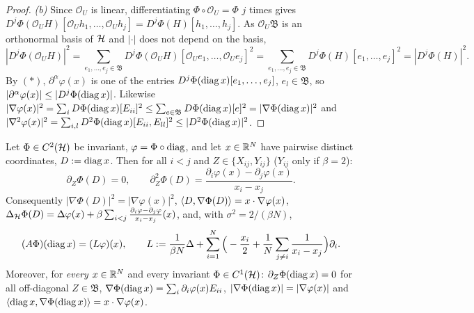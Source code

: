 \begin{proof}
\emph{(b)} Since $\mathcal O_U$ is linear, differentiating $\Phi\circ\mathcal O_U=\Phi$ $j$ times gives $D^j\Phi(\mathcal O_UH)[\mathcal O_Uh_1,\dots,\mathcal O_Uh_j]=D^j\Phi(H)[h_1,\dots,h_j]$.
As $\mathcal O_U\mathfrak B$ is an orthonormal basis of $\mathcal{H}$ and $|\cdot|$ does not depend on the basis,
\[|D^j\Phi(\mathcal O_UH)|^2=\sum_{e_1,\dots,e_j\in\mathfrak B}D^j\Phi(\mathcal O_UH)[\mathcal O_Ue_1,\dots,\mathcal O_Ue_j]^2=\sum_{e_1,\dots,e_j\in\mathfrak B}D^j\Phi(H)[e_1,\dots,e_j]^2=|D^j\Phi(H)|^2 .\]
By $(\ast)$, $\partial^\alpha\varphi(x)$ is one of the entries $D^j\Phi(\operatorname{diag} x)[e_1,\dots,e_j]$, $e_l\in\mathfrak B$, so $|\partial^\alpha\varphi(x)|\le|D^j\Phi(\operatorname{diag} x)|$.
Likewise $|\nabla\varphi(x)|^2=\sum_i D\Phi(\operatorname{diag} x)[E_{ii}]^2\le\sum_{e\in\mathfrak B}D\Phi(\operatorname{diag} x)[e]^2=|\nabla\Phi(\operatorname{diag} x)|^2$ and $|\nabla^2\varphi(x)|^2=\sum_{i,l}D^2\Phi(\operatorname{diag} x)[E_{ii},E_{ll}]^2\le|D^2\Phi(\operatorname{diag} x)|^2$.
\end{proof}

\begin{lemma}\label{lem:givens}
Let $\Phi\in C^2(\mathcal{H})$ be invariant, $\varphi=\Phi\circ\operatorname{diag}$, and let $x\in\mathbb{R}^N$ have pairwise distinct coordinates, $D:=\operatorname{diag} x$. Then for all $i<j$ and $Z\in\{X_{ij},Y_{ij}\}$ ($Y_{ij}$ only if $\beta=2$):
\begin{equation}\label{givens}
\partial_Z\Phi(D)=0,\qquad \partial_Z^2\Phi(D)=\frac{\partial_i\varphi(x)-\partial_j\varphi(x)}{x_i-x_j}.
\end{equation}
Consequently $|\nabla\Phi(D)|^2=|\nabla\varphi(x)|^2$, $\langle D,\nabla\Phi(D)\rangle=x\cdot\nabla\varphi(x)$,
$\Delta_{\mathcal{H}}\Phi(D)=\Delta\varphi(x)+\beta\sum_{i<j}\frac{\partial_i\varphi-\partial_j\varphi}{x_i-x_j}(x)$, and, with $\sigma^2=2/(\beta N)$,
\begin{equation}\label{L}
(A\Phi)(\operatorname{diag} x)=(L\varphi)(x),\qquad L:=\frac1{\beta N}\Delta+\sum_{i=1}^N\Big(-\frac{x_i}{2}+\frac1N\sum_{j\ne i}\frac{1}{x_i-x_j}\Big)\partial_i .
\end{equation}
Moreover, for \emph{every} $x\in\mathbb{R}^N$ and every invariant $\Phi\in C^1(\mathcal{H})$: $\partial_Z\Phi(\operatorname{diag} x)=0$ for all off-diagonal $Z\in\mathfrak B$, $\nabla\Phi(\operatorname{diag} x)=\sum_i\partial_i\varphi(x)E_{ii}$, $|\nabla\Phi(\operatorname{diag} x)|=|\nabla\varphi(x)|$ and $\langle\operatorname{diag} x,\nabla\Phi(\operatorname{diag} x)\rangle=x\cdot\nabla\varphi(x)$.
\end{lemma}

